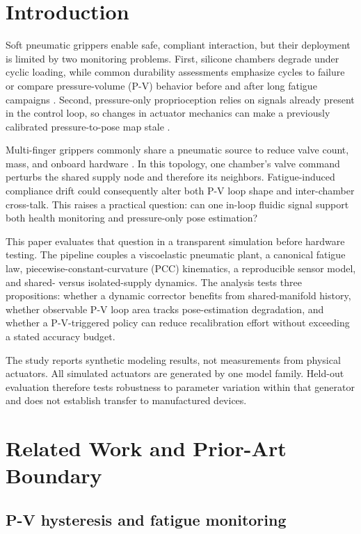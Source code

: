 \documentclass[preprints,article,submit,oneauthor]{Definitions/mdpi}
\begin{document}
\section{Introduction}

Soft pneumatic grippers enable safe, compliant interaction, but their deployment is limited by two monitoring problems. First, silicone chambers degrade under cyclic loading, while common durability assessments emphasize cycles to failure or compare pressure-volume (P-V) behavior before and after long fatigue campaigns \citep{mosadegh2014,mosadegh2020,wong2026}. Second, pressure-only proprioception relies on signals already present in the control loop, so changes in actuator mechanics can make a previously calibrated pressure-to-pose map stale \citep{wang2020}.

Multi-finger grippers commonly share a pneumatic source to reduce valve count, mass, and onboard hardware \citep{mcdonald2021,moran2024}. In this topology, one chamber's valve command perturbs the shared supply node and therefore its neighbors. Fatigue-induced compliance drift could consequently alter both P-V loop shape and inter-chamber cross-talk. This raises a practical question: can one in-loop fluidic signal support both health monitoring and pressure-only pose estimation?

This paper evaluates that question in a transparent simulation before hardware testing. The pipeline couples a viscoelastic pneumatic plant, a canonical fatigue law, piecewise-constant-curvature (PCC) kinematics, a reproducible sensor model, and shared- versus isolated-supply dynamics. The analysis tests three propositions: whether a dynamic corrector benefits from shared-manifold history, whether observable P-V loop area tracks pose-estimation degradation, and whether a P-V-triggered policy can reduce recalibration effort without exceeding a stated accuracy budget.

The study reports synthetic modeling results, not measurements from physical actuators. All simulated actuators are generated by one model family. Held-out evaluation therefore tests robustness to parameter variation within that generator and does not establish transfer to manufactured devices.

\section{Related Work and Prior-Art Boundary}

\subsection{P-V hysteresis and fatigue monitoring}
\end{document}

